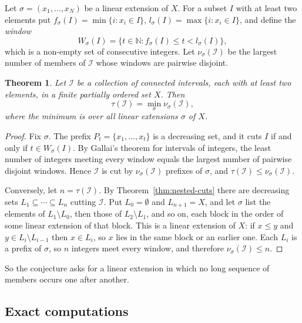 \documentclass[10pt, a4paper]{article}
\theoremstyle{plain}
\newtheorem{theorem}{Theorem}[section]
\theoremstyle{definition}
\newcommand{\I}{\mathcal{I}}
\newcommand{\NN}{\mathbb{N}}
\begin{document}
Let $\sigma=(x_1,\ldots,x_N)$ be a linear extension of $X$. For a subset $I$ with at
least two elements put $f_\sigma(I)=\min\{i : x_i\in I\}$,
$l_\sigma(I)=\max\{i : x_i\in I\}$, and define the \emph{window}
\[
  W_\sigma(I)=\{t\in\NN : f_\sigma(I)\le t<l_\sigma(I)\},
\]
which is a non-empty set of consecutive integers. Let $\nu_\sigma(\I)$ be the largest
number of members of $\I$ whose windows are pairwise disjoint.

\begin{theorem}\label{thm:linear-extensions}
  Let $\I$ be a collection of connected intervals, each with at least two elements, in
  a finite partially ordered set $X$. Then
  \[
    \tau(\I)=\min_\sigma \nu_\sigma(\I),
  \]
  where the minimum is over all linear extensions $\sigma$ of $X$.
\end{theorem}

\begin{proof}
  Fix $\sigma$. The prefix $P_t=\{x_1,\ldots,x_t\}$ is a decreasing set, and it cuts
  $I$ if and only if $t\in W_\sigma(I)$. By Gallai's theorem for intervals of integers,
  the least number of integers meeting every window equals the largest number of
  pairwise disjoint windows. Hence $\I$ is cut by $\nu_\sigma(\I)$ prefixes of
  $\sigma$, and $\tau(\I)\le\nu_\sigma(\I)$.

  Conversely, let $n=\tau(\I)$. By Theorem~\ref{thm:nested-cuts} there are decreasing
  sets $L_1\subseteq\cdots\subseteq L_n$ cutting $\I$. Put $L_0=\emptyset$ and
  $L_{n+1}=X$, and let $\sigma$ list the elements of $L_1\setminus L_0$, then those of
  $L_2\setminus L_1$, and so on, each block in the order of some linear extension of
  that block. This is a linear extension of $X$: if $x\le y$ and
  $y\in L_i\setminus L_{i-1}$ then $x\in L_i$, so $x$ lies in the same block or an
  earlier one. Each $L_i$ is a prefix of $\sigma$, so $n$ integers meet every window,
  and therefore $\nu_\sigma(\I)\le n$.
\end{proof}

So the conjecture asks for a linear extension in which no long sequence of members
occurs one after another.

\subsection{Exact computations}
\end{document}
